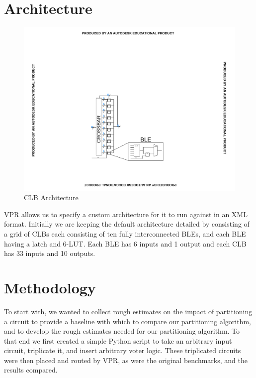 \documentclass[12pt,final,oneside]{memoir} %
\begin{document}
\section{Architecture}\label{ArchFile}
\begin{figure}
    \begin{center}
        \includegraphics[clip,trim=8cm 4cm 8cm 8cm]{images/CLB.pdf}
        \caption{\ac{CLB} Architecture}
        \label{Arch}
    \end{center}
\end{figure}
\ac{VPR} allows us to specify a custom architecture for it to run against in an XML format. Initially we are keeping the default architecture detailed by \cite{VPRManual} consisting of a grid of \acp{CLB} each consisting of ten fully interconnected \acp{BLE}, and each \ac{BLE} having a latch and 6-\ac{LUT}.
Each \ac{BLE} has 6 inputs and 1 output and each \ac{CLB} has 33 inputs and 10 outputs.



\section{Methodology}\label{BenchmarkMethod}
To start with, we wanted to collect rough estimates on the impact of partitioning a circuit to provide a baseline with which to compare our partitioning algorithm, and to develop the rough estimates needed for our partitioning algorithm. To that end we first created a simple Python script to take an arbitrary input circuit, triplicate it, and insert arbitrary voter logic. These triplicated circuits were then placed and routed by \ac{VPR}, as were the original benchmarks, and the results compared.
\end{document}
